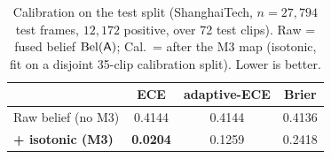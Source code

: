 \begin{table}[t]
\centering
\caption{Calibration on the test split (ShanghaiTech, $n{=}27{,}794$ test
frames, $12{,}172$ positive, over 72 test clips). Raw = fused belief
$\mathrm{Bel}(\textsf{A})$; Cal.\ = after the M3 map (isotonic, fit on a disjoint
35-clip calibration split). Lower is better.}
\label{tab:calib}
\setlength{\tabcolsep}{5pt}
\renewcommand{\arraystretch}{1.15}
\footnotesize
\begin{tabular}{@{}lccc@{}}
\toprule
 & ECE & adaptive-ECE & Brier \\
\midrule
Raw belief (no M3)          & 0.4144 & 0.4144 & 0.4136 \\
\textbf{+ isotonic (M3)}   & \textbf{0.0204} & 0.1259 & 0.2418 \\
\bottomrule
\end{tabular}
\end{table}
